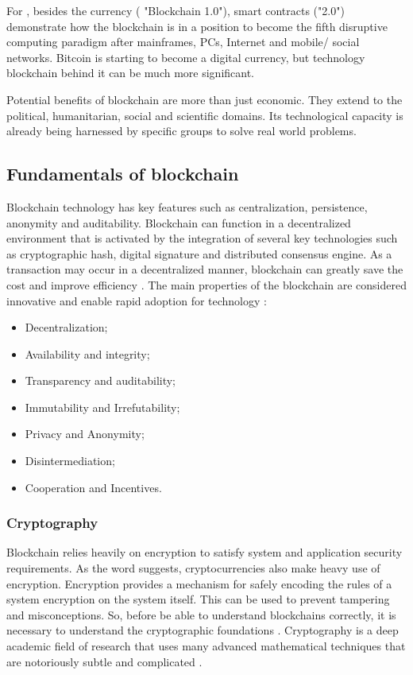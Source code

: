 For \cite{swan2015blockchain}, besides the currency ( "Blockchain 1.0"), smart contracts ("2.0") demonstrate how the blockchain is in a position to become the fifth disruptive computing paradigm after mainframes, PCs, Internet and mobile/ social networks. Bitcoin is starting to become a digital currency, but technology blockchain behind it can be much more significant.

Potential benefits of blockchain are more than just economic. They extend to the political, humanitarian, social and scientific domains. Its technological capacity is already being harnessed by specific groups to solve real world problems.

\subsection{Fundamentals of blockchain}\label{sec:fundamentals}

Blockchain technology has key features such as centralization, persistence, anonymity and auditability. Blockchain can function in a decentralized environment that is activated by the integration of several key technologies such as cryptographic hash, digital signature and distributed consensus engine. As a transaction may occur in a decentralized manner, blockchain can greatly save the cost and improve efficiency \cite{zheng2016blockchain}. The main properties of the blockchain are considered innovative and enable rapid adoption for technology \cite{greve2018blockchain}:

\begin{itemize}
\item Decentralization;
\item Availability and integrity;
\item Transparency and auditability;
\item Immutability and Irrefutability;
\item Privacy and Anonymity;
\item Disintermediation;
\item Cooperation and Incentives.
\end{itemize}


\subsubsection{Cryptography}\label{sec:criptografia}
Blockchain relies heavily on encryption to satisfy system and application security requirements. As the word suggests, cryptocurrencies also make heavy use of encryption. Encryption provides a mechanism for safely encoding the rules of a system encryption on the system itself. This can be used to prevent tampering and misconceptions. So, before be able to understand blockchains correctly, it is necessary to understand the cryptographic foundations \cite{narayanan2016bitcoin}. Cryptography is a deep academic field of research that uses many advanced mathematical techniques that are notoriously subtle and complicated \cite{narayanan2016bitcoin}.


